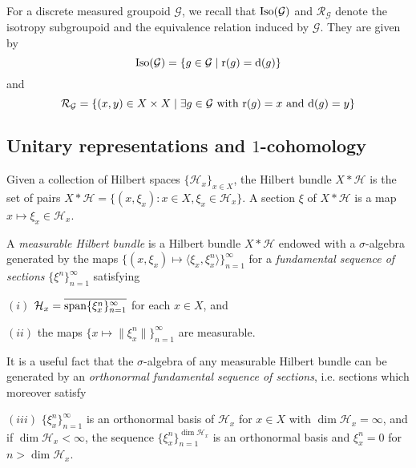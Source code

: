 \documentclass[a4paper,11pt]{article}
\numberwithin{equation}{section}
\theoremstyle{definition}
\theoremstyle{remark}
\numberwithin{equation}{section}
\newcommand{\rG}{\mathcal{G}}
\def\H{\mathcal H}
\newcommand{\ol}[1]{\overline{#1}}
\newcommand{\spn}{{\rm span}}
\def\r{{\rm r}}
\def\d{{\rm d}}
\def\<{\langle}
\def\>{\rangle}
\numberwithin{equation}{section}
\begin{document}
For a discrete measured groupoid $\rG$, we recall that ${\rm Iso}(\rG)$ and $\mathcal R_\rG$ denote the isotropy subgroupoid and the equivalence relation induced by $\rG$. They are given by $${\rm Iso}(\rG)=\{g\in\rG\mid \r(g)=\d(g)\}$$ and $$\mathcal R_\rG=\{(x,y)\in X\times X\mid \exists g\in\rG\text{ with }\r(g)=x \text{ and }\d(g)=y\}$$








\subsection{Unitary representations and $1$-cohomology}

Given a collection of Hilbert spaces $\{\H_x\}_{x \in X}$, the Hilbert bundle $X \ast \H$ is the set of pairs $X \ast \H = \{(x, \xi_x) : x \in X, \xi_x \in \H_x\}$. 
A section $\xi$ of $X \ast \H$ is a map $x \mapsto \xi_x \in \H_x$. 

A {\it measurable Hilbert bundle} is a Hilbert bundle $X \ast \H$ endowed with a $\sigma$-algebra generated by the maps $\{(x, \xi_x) \mapsto \<\xi_x, \xi^n_x\>\}_{n = 1}^\infty$ for a {\it fundamental sequence of sections} $\{\xi^n\}_{n = 1}^\infty$ satisfying 

$(i)$ $\H_x = \ol{\spn \{\xi^n_x\}_{n = 1}^\infty}$ for each $x \in X$, and 

$(ii)$ the maps $\{x \mapsto \|\xi^n_x\|\}_{n = 1}^\infty$ are measurable. 

It is a useful fact that the $\sigma$-algebra of any measurable Hilbert bundle can be generated by an {\it orthonormal fundamental sequence of sections}, i.e. sections which moreover satisfy 

$(iii)$ $\{\xi^n_x\}_{n = 1}^{\infty}$ is an orthonormal basis of $\H_x$ for $x \in X$ with $\dim \H_x = \infty$, and if $\dim \H_x < \infty$, the sequence $\{\xi^n_x\}_{n = 1}^{\dim \H_x}$ is an orthonormal basis and $\xi^n_x = 0$ for $n > \dim \H_x$. 
\\
\end{document}
